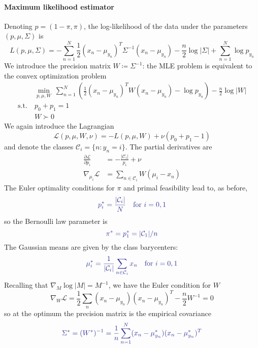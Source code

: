 \documentclass[11pt]{article}
\newcommand{\suchthat}{\mathrm{s.t.}}
\newcommand{\calL}{\mathcal{L}}
\newcommand{\calC}{\mathcal{C}}
\begin{document}
\paragraph{Maximum likelihood estimator} Denoting $p = (1-\pi, \pi)$, the log-likelihood of the data under the parameters $(p, \mu, \Sigma)$ is
\begin{equation}
L(p, \mu, \Sigma) =
-\sum_{n=1}^N
\frac{1}{2}(x_n - \mu_{y_n})^T\Sigma^{-1}(x_n - \mu_{y_n}) - \frac{n}{2}\log|\Sigma|
+ \sum_{n=1}^N \log p_{y_n}
\end{equation}
We introduce the precision matrix $W \coloneqq \Sigma^{-1}$: the MLE problem is equivalent to the convex optimization problem
\begin{equation}
\begin{aligned}
	&\min_{p,\mu,W}~
	\sum_{n=1}^N \left(
	\frac{1}{2}(x_n-\mu_{y_n})^TW(x_n-\mu_{y_n}) - \log p_{y_n}
	\right)
	- \frac{n}{2}\log|W| \\
	\suchthat\ & p_0 + p_1 = 1 \\
	&W \succ 0
\end{aligned}
\end{equation}
We again introduce the Lagrangian
\[
	\calL(p, \mu, W, \nu) =
	-L(p, \mu, W) + \nu(p_0 + p_1 - 1)
\]
and denote the classes $\mathcal{C}_i = \{n: y_n = i\}$. The partial derivatives are
\begin{equation}
\begin{aligned}
\frac{\partial\calL}{\partial p_i} &= -\frac{|\calC_i|}{p_i} + \nu  \\
\nabla_{\mu_i}\calL &= \sum_{n\in\calC_i} W(\mu_i - x_n)
\end{aligned}
\end{equation}
The Euler optimality conditions for $\pi$ and primal feasibility lead to, as before,
\begin{equation}\label{eq:LDAclassProbas}
{\color{Blue}
	p^*_i = \frac{|\calC_i|}{N}
	\quad \text{for } i = 0,1
}
\end{equation}
so the Bernoulli law parameter is \begin{equation}\label{eq:LDAbernoulliParam}
{\color{Blue}
\pi^* = p^*_1 = |\calC_1|/n
}
\end{equation}
The Gaussian means are given by the class barycenters:
\begin{equation}\label{eq:LDAclassMean}
{\color{Blue}
	\mu^*_i = \frac{1}{|\calC_i|}\sum_{n\in\calC_i} x_n
	\quad \text{for } i = 0,1
}
\end{equation}
Recalling that $\nabla_M \log|M| = M^{-1}$, we have the Euler condition for $W$
\[
	\nabla_W\calL =
	\frac{1}{2}\sum_n (x_n-\mu_{y_n})(x_n-\mu_{y_n})^T - \frac{n}{2}W^{-1}
	= 0
\]
so at the optimum the precision matrix is the empirical covariance
\begin{equation}\label{eq:LDAcovar}
{\color{Blue}
	\Sigma^* = (W^*)^{-1} =
	\frac{1}{n} \sum_{n=1}^N (x_n - \mu^*_{y_n})(x_n - \mu^*_{y_n})^T
}
\end{equation}
\end{document}
